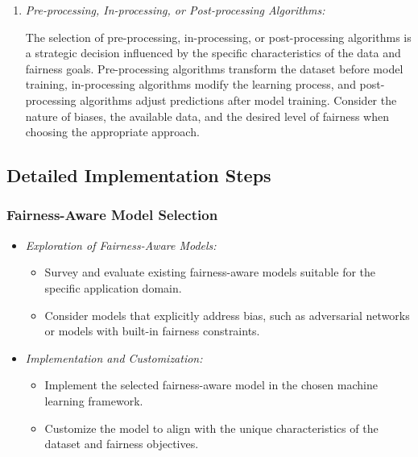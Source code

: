 \documentclass[12pt,a4paper,openright,twoside]{book}
\begin{document}
\begin{enumerate}
    \item \emph{Pre-processing, In-processing, or Post-processing Algorithms:} 
    
    The selection of pre-processing, in-processing, or post-processing algorithms is a strategic decision influenced by the specific characteristics of the data and fairness goals. Pre-processing algorithms transform the dataset before model training, in-processing algorithms modify the learning process, and post-processing algorithms adjust predictions after model training. Consider the nature of biases, the available data, and the desired level of fairness when choosing the appropriate approach.

\end{enumerate}

\subsection{Detailed Implementation Steps}


\subsubsection{Fairness-Aware Model Selection}

\begin{itemize}

    \item \emph{Exploration of Fairness-Aware Models:}
     
    \begin{itemize}
    
        \item Survey and evaluate existing fairness-aware models suitable for the specific application domain.
    
        \item Consider models that explicitly address bias, such as adversarial networks or models with built-in fairness constraints.
    
    \end{itemize}
    
    \item \emph{Implementation and Customization:}
    
    \begin{itemize}
    
        \item Implement the selected fairness-aware model in the chosen machine learning framework.
    
        \item Customize the model to align with the unique characteristics of the dataset and fairness objectives.
    
    \end{itemize}

\end{itemize}
\end{document}
